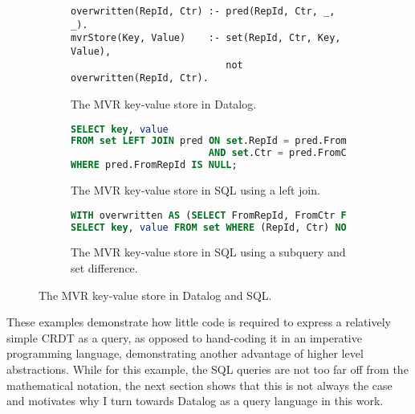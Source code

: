\begin{figure}[htpb]
    \centering

    \begin{subfigure}[b]{\textwidth}
        \begin{lstlisting}[keepspaces]
overwritten(RepId, Ctr) :- pred(RepId, Ctr, _, _).
mvrStore(Key, Value)    :- set(RepId, Ctr, Key, Value),
                           not overwritten(RepId, Ctr).\end{lstlisting}
        \caption{The \ac{MVR} key-value store in Datalog.}\label{code:mvr-store-datalog}
    \end{subfigure}

    \vspace{1em}

    \begin{subfigure}[b]{\textwidth}
        \begin{lstlisting}[language=SQL]
SELECT key, value
FROM set LEFT JOIN pred ON set.RepId = pred.FromRepId
                        AND set.Ctr = pred.FromCtr
WHERE pred.FromRepId IS NULL;\end{lstlisting}
        \caption{The \ac{MVR} key-value store in SQL using a left join.}\label{code:mvr-store-sql-left-join}
    \end{subfigure}

    \vspace{1em}

    \begin{subfigure}[b]{\textwidth}
        \begin{lstlisting}[language=SQL]
WITH overwritten AS (SELECT FromRepId, FromCtr FROM pred)
SELECT key, value FROM set WHERE (RepId, Ctr) NOT IN overwritten;\end{lstlisting}
        \caption{The \ac{MVR} key-value store in SQL using a subquery and set difference.}\label{code:mvr-store-sql-subquery}
    \end{subfigure}

    \caption{The \ac{MVR} key-value store in Datalog and SQL.}\label{code:mvr-store}
\end{figure}

These examples demonstrate how little code is required to express a relatively
simple \ac{CRDT} as a query, as opposed to hand-coding it in an imperative
programming language, demonstrating another advantage of higher level abstractions.
While for this example, the SQL queries are not too far off from the mathematical
notation, the next section shows that this is not always the case and motivates
why I turn towards Datalog as a query language in this work.

